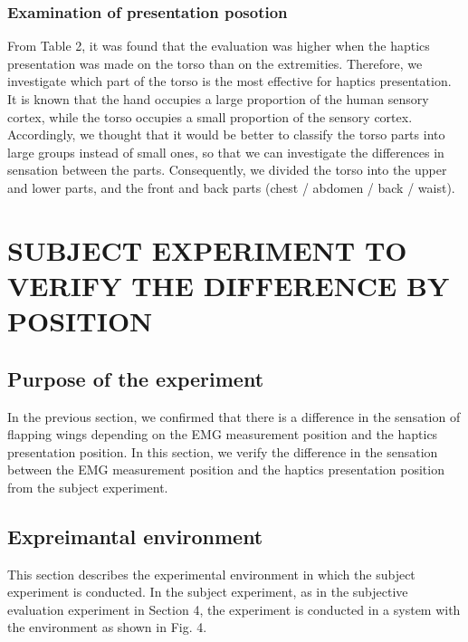 \documentclass[letterpaper, 10 pt, conference]{ieeeconf}  %
\begin{document}
                \subsubsection{Examination of presentation posotion}
                        From Table 2, it was found that the evaluation was higher when the haptics presentation was made on the torso than on the extremities. 
                        Therefore, we investigate which part of the torso is the most effective for haptics presentation. 
                        It is known that the hand occupies a large proportion of the human sensory cortex, while the torso occupies a small proportion of the sensory cortex\cite{penfield1950cerebral}. 
                        Accordingly, we thought that it would be better to classify the torso parts into large groups instead of small ones, so that we can investigate the differences in sensation between the parts. 
                        Consequently, we divided the torso into the upper and lower parts, and the front and back parts (chest / abdomen / back / waist).        


\section{SUBJECT EXPERIMENT TO VERIFY THE DIFFERENCE BY POSITION}

        \subsection{Purpose of the experiment}
                In the previous section, we confirmed that there is a difference in the sensation of flapping wings depending on the EMG measurement position and the haptics presentation position.  
                In this section, we verify the difference in the sensation between the EMG measurement position and the haptics presentation position from the subject experiment.  

        \subsection{Expreimantal environment}
                This section describes the experimental environment in which the subject experiment is conducted.  
                In the subject experiment, as in the subjective evaluation experiment in Section 4, the experiment is conducted in a system with the environment as shown in Fig. 4.  
\end{document}
